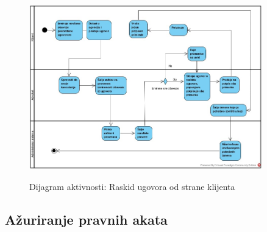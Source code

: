 \documentclass[20pt]{article}
\begin{document}
\begin{figure}[h]
        \centering
        \includegraphics[width=0.9\textwidth,height=0.74\textheight]{Pictures/raskidUgovoraOdStraneKlijenta}\\
        \caption{Dijagram aktivnosti: Raskid ugovora od strane klijenta}
        \label{fig:dijagramAktivnostiRaskidUgovoraOdKlijenta}
    \end{figure}

\newpage
\subsection{\bfseries \Large A\v {z}uriranje pravnih akata}
\setlength{\parindent}{1cm}
\fontsize{13}{18} \selectfont 
\end{document}
